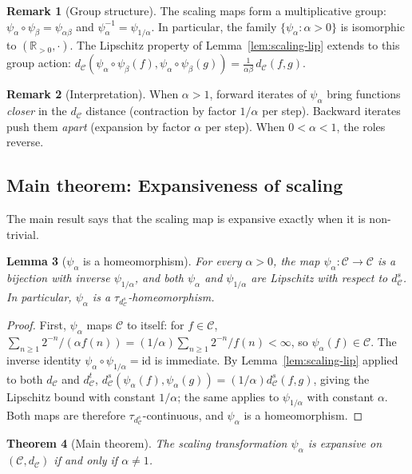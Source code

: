 \documentclass[11pt,a4paper]{article}
\theoremstyle{plain}
\newtheorem{theoreminner}{Theorem}[section]
\newtheorem{lemmainner}[theoreminner]{Lemma}
\theoremstyle{definition}
\newtheorem{remarkinner}[theoreminner]{Remark}
\newenvironment{theorem}[1][]{\begin{theoreminner}[#1]}{\end{theoreminner}}
\newenvironment{lemma}[1][]{\begin{lemmainner}[#1]}{\end{lemmainner}}
\newenvironment{remark}[1][]{\begin{remarkinner}[#1]}{\end{remarkinner}}
\newcommand{\R}{\mathbb{R}}
\newcommand{\C}{\mathcal{C}}
\begin{document}
\begin{remark}[Group structure]
The scaling maps form a multiplicative group:
$\psi_\alpha\circ\psi_\beta=\psi_{\alpha\beta}$ and
$\psi_\alpha^{-1}=\psi_{1/\alpha}$.  In particular, the family
$\{\psi_\alpha:\alpha>0\}$ is isomorphic to $(\R_{>0},\cdot)$.
The Lipschitz property of Lemma~\ref{lem:scaling-lip} extends
to this group action:
$d_\C(\psi_\alpha\circ\psi_\beta(f),\psi_\alpha\circ\psi_\beta(g))
=\frac{1}{\alpha\beta}\,d_\C(f,g)$.
\end{remark}

\begin{remark}[Interpretation]
When $\alpha>1$, forward iterates of $\psi_\alpha$ bring functions
\emph{closer} in the $d_\C$ distance (contraction by factor
$1/\alpha$ per step).  Backward iterates push them \emph{apart}
(expansion by factor $\alpha$ per step).  When $0<\alpha<1$, the
roles reverse.
\end{remark}


\subsection{Main theorem: Expansiveness of scaling}

The main result says that the scaling map is expansive exactly
when it is non-trivial.

\begin{lemma}[$\psi_\alpha$ is a homeomorphism]\label{lem:psi-homeo}
For every $\alpha>0$, the map $\psi_\alpha\colon\C\to\C$ is a
bijection with inverse $\psi_{1/\alpha}$, and both $\psi_\alpha$
and $\psi_{1/\alpha}$ are Lipschitz with respect to $d_\C^s$.  In
particular, $\psi_\alpha$ is a $\tau_{d_\C^s}$-homeomorphism.
\end{lemma}

\begin{proof}
First, $\psi_\alpha$ maps $\C$ to itself: for $f\in\C$,
$\sum_{n\ge 1}2^{-n}/(\alpha f(n))=(1/\alpha)\sum_{n\ge 1}2^{-n}/f(n)
<\infty$, so $\psi_\alpha(f)\in\C$.  The inverse identity
$\psi_\alpha\circ\psi_{1/\alpha}=\mathrm{id}$ is immediate.  By
Lemma~\ref{lem:scaling-lip} applied to both $d_\C$ and $d_\C^t$,
$d_\C^s(\psi_\alpha(f),\psi_\alpha(g))=(1/\alpha)d_\C^s(f,g)$,
giving the Lipschitz bound with constant $1/\alpha$; the same
applies to $\psi_{1/\alpha}$ with constant $\alpha$.  Both maps are
therefore $\tau_{d_\C^s}$-continuous, and $\psi_\alpha$ is a
homeomorphism.
\end{proof}

\begin{theorem}[Main theorem]\label{thm:main-scaling}
The scaling transformation $\psi_\alpha$ is expansive on $(\C,d_\C)$
if and only if $\alpha\neq 1$.
\end{theorem}
\end{document}
